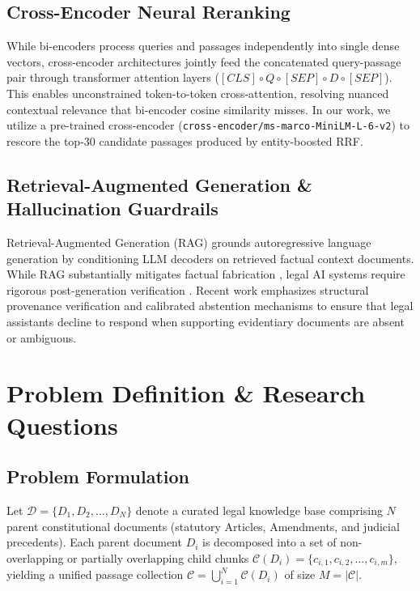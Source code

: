 \documentclass[10pt,twocolumn]{article}
\begin{document}
\subsection{Cross-Encoder Neural Reranking}
While bi-encoders process queries and passages independently into single dense vectors, cross-encoder architectures \cite{nogueira2019passage} jointly feed the concatenated query-passage pair through transformer attention layers ($[CLS] \circ Q \circ [SEP] \circ D \circ [SEP]$). This enables unconstrained token-to-token cross-attention, resolving nuanced contextual relevance that bi-encoder cosine similarity misses. In our work, we utilize a pre-trained cross-encoder (\texttt{cross-encoder/ms-marco-MiniLM-L-6-v2}) to rescore the top-30 candidate passages produced by entity-boosted RRF.

\subsection{Retrieval-Augmented Generation \& Hallucination Guardrails}
Retrieval-Augmented Generation (RAG) \cite{lewis2020retrieval} grounds autoregressive language generation by conditioning LLM decoders on retrieved factual context documents. While RAG substantially mitigates factual fabrication \cite{ji2023survey}, legal AI systems require rigorous post-generation verification \cite{henderson2023foundation}. Recent work emphasizes structural provenance verification and calibrated abstention mechanisms to ensure that legal assistants decline to respond when supporting evidentiary documents are absent or ambiguous.

\section{Problem Definition \& Research Questions}
\label{sec:problem_def}

\subsection{Problem Formulation}
Let $\mathcal{D} = \{D_1, D_2, \dots, D_N\}$ denote a curated legal knowledge base comprising $N$ parent constitutional documents (statutory Articles, Amendments, and judicial precedents). Each parent document $D_i$ is decomposed into a set of non-overlapping or partially overlapping child chunks $\mathcal{C}(D_i) = \{c_{i,1}, c_{i,2}, \dots, c_{i,m}\}$, yielding a unified passage collection $\mathcal{C} = \bigcup_{i=1}^N \mathcal{C}(D_i)$ of size $M = |\mathcal{C}|$.
\end{document}
